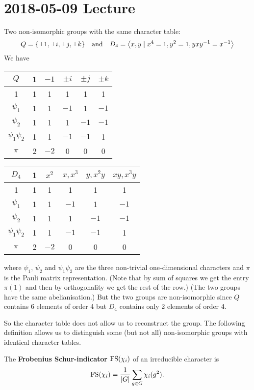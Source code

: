 \section{2018-05-09 Lecture}

\begin{exam}
  Two non-isomorphic groups with the same character table:
  \[ Q = \{ \pm 1, \pm i, \pm j, \pm k \} \quad\text{and}\quad D_4 = {\left\langle x,y \mid x^4=1,y^2=1,yxy^{-1}=x^{-1} \right\rangle} \]
  We have
  \begin{center}
    \begin{tabular}[]{c | c c c c c}
      $Q$ & 1 & $-1$ & $\pm i$ & $\pm j$ & $\pm k$ \\ \hline
      1 & 1 & 1 & 1 & 1 & 1 \\
      $\psi_1$ & 1 & 1 & $-1$ & 1 & $-1$ \\
      $\psi_2$ & 1 & 1 & 1 & $-1$ & $-1$ \\
      $\psi_1\psi_2$ & 1 & 1 & $-1$ & $-1$ & 1 \\
      $\pi$ & 2 & $-2$ & 0 & 0 & 0
    \end{tabular}
    \hspace{1cm}
    \begin{tabular}[]{c | c c c c c}
      $D_4$ & 1 & $x^2$ & $x,x^3$ & $y,x^2y$ & $xy,x^3y$ \\ \hline
      1 & 1 & 1 & 1 & 1 & 1 \\
      $\psi_1$ & 1 & 1 & $-1$ & 1 & $-1$ \\
      $\psi_2$ & 1 & 1 & 1 & $-1$ & $-1$ \\
      $\psi_1\psi_2$ & 1 & 1 & $-1$ & $-1$ & 1 \\
      $\pi$ & 2 & $-2$ & 0 & 0 & 0
    \end{tabular}
  \end{center}
  where $\psi_1$, $\psi_2$ and $\psi_1\psi_2$ are the three non-trivial one-dimensional characters and $\pi$ is the Pauli matrix representation.
  (Note that by sum of squares we get the entry $\pi(1)$ and then by orthogonality we get the rest of the row.)
  (The two groups have the same abelianisation.)
  But the two groups are non-isomorphic since $Q$ contains 6 elements of order 4 but $D_4$ contains only 2 elements of order 4.
\end{exam}

So the character table does not allow us to reconstruct the group.
The following definition allows us to distinguish some (but not all) non-isomorphic groups with identical character tables.

\begin{defn}
  The \textbf{Frobenius Schur-indicator} $\operatorname{FS}(\chi_i)$ of an irreducible character is
  \[ \operatorname{FS}(\chi_i) = \frac{1}{\left\lvert G \right\rvert} \sum_{g \in G} \chi_i(g^2). \]
\end{defn}

